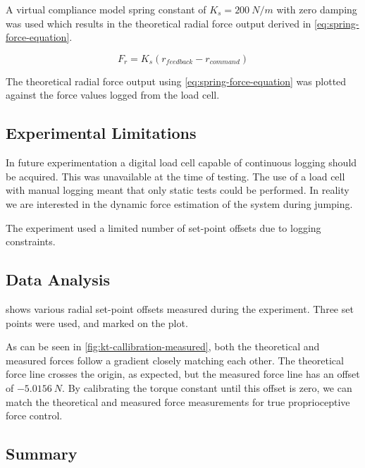 A virtual compliance model spring constant of $K_s = 200\ N/m$  with zero damping was used which results in the theoretical radial force output derived in \cref{eq:spring-force-equation}.

\begin{equation} \label{eq:spring-force-equation}
F_r = K_s(r_{feedback} - r_{command})
\end{equation}

The theoretical radial force output using \cref{eq:spring-force-equation} was plotted against the force values logged from the load cell. 

\subsection{Experimental Limitations}

In future experimentation a digital load cell capable of continuous logging should be acquired. This was unavailable at the time of testing. The use of a load cell with manual logging meant that only static tests could be performed. In reality we are interested in the dynamic force estimation of the system during jumping. 

The experiment used a limited number of set-point offsets due to logging constraints.

\subsection{Data Analysis}

 shows various radial set-point offsets measured during the experiment. Three set points were used, and marked on the plot. 

As can be seen in \cref{fig:kt-callibration-measured}, both the theoretical and measured forces follow a gradient closely matching each other. The theoretical force line crosses the origin, as expected, but the measured force line has an offset of $-5.0156\ N$. By calibrating the torque constant until this offset is zero, we can match the theoretical and measured force measurements for true proprioceptive force control.

\subsection{Summary}

